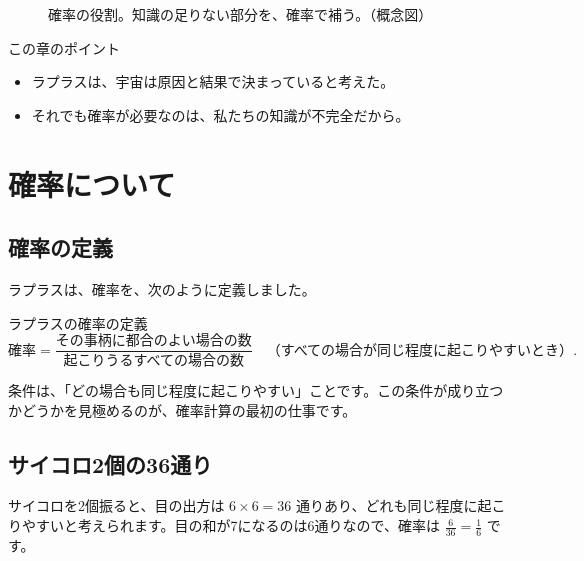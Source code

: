 \documentclass[a4paper,11pt,openany]{ltjsbook}
\begin{document}
\begin{figure}[htbp]
\centering
{}
\caption{確率の役割。知識の足りない部分を、確率で補う。（概念図）}
\end{figure}

\begin{pointbox}{この章のポイント}
\begin{itemize}[leftmargin=1.5em]
\item ラプラスは、宇宙は原因と結果で決まっていると考えた。
\item それでも確率が必要なのは、私たちの知識が不完全だから。
\end{itemize}
\end{pointbox}

\chapter{確率について}

\section{確率の定義}

ラプラスは、確率を、次のように定義しました。

\begin{pointbox}{ラプラスの確率の定義}
\[
\text{確率}=\frac{\text{その事柄に都合のよい場合の数}}{\text{起こりうるすべての場合の数}}
\quad\text{（すべての場合が同じ程度に起こりやすいとき）}.
\]
\end{pointbox}

条件は、「どの場合も同じ程度に起こりやすい」ことです。この条件が成り立つかどうかを見極めるのが、確率計算の最初の仕事です。

\section{サイコロ2個の36通り}

サイコロを2個振ると、目の出方は $6\times6=36$ 通りあり、どれも同じ程度に起こりやすいと考えられます。目の和が7になるのは6通りなので、確率は $\frac{6}{36}=\frac16$ です。
\end{document}
